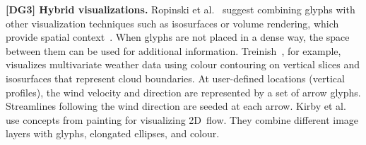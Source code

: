 \textbf{[DG3] Hybrid visualizations.}
Ropinski et al.~\cite{ropinskiPreim08glyphTaxonomy} suggest combining glyphs with other visualization techniques such as isosurfaces or volume rendering, 
which provide spatial context~\cite{ropinski07surfaceglyphs, crawfisMax93textureSplats}.
When glyphs are not placed in a dense way, the space between them can be used for additional information.
Treinish~\cite{TreinishEffektiveWeather}, for example, visualizes multivariate weather data using colour contouring on vertical slices and isosurfaces that represent cloud boundaries.
At user-defined locations (vertical profiles), the wind velocity and direction are represented by a set of arrow glyphs.
Streamlines following the wind direction are seeded at each arrow.
Kirby et al.~\cite{kirby99multiValueFlow} use concepts from painting for visualizing 2D~flow. They combine different image layers with glyphs, elongated ellipses, and colour.
